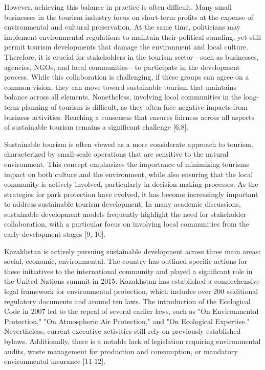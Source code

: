 However, achieving this balance in practice is often difficult. Many
small businesses in the tourism industry focus on short-term profits at
the expense of environmental and cultural preservation. At the same
time, politicians may implement environmental regulations to maintain
their political standing, yet still permit tourism developments that
damage the environment and local culture. Therefore, it is crucial for
stakeholders in the tourism sector---such as businesses, agencies, NGOs,
and local communities---to participate in the development process. While
this collaboration is challenging, if these groups can agree on a common
vision, they can move toward sustainable tourism that maintains balance
across all elements. Nonetheless, involving local communities in the
long-term planning of tourism is difficult, as they often face negative
impacts from business activities. Reaching a consensus that ensures
fairness across all aspects of sustainable tourism remains a significant
challenge {[}6,8{]}.

Sustainable tourism is often viewed as a more considerate approach to
tourism, characterized by small-scale operations that are sensitive to
the natural environment. This concept emphasizes the importance of
minimizing tourism\textquotesingle s impact on both culture and the
environment, while also ensuring that the local community is actively
involved, particularly in decision-making processes. As the strategies
for park protection have evolved, it has become increasingly important
to address sustainable tourism development. In many academic
discussions, sustainable development models frequently highlight the
need for stakeholder collaboration, with a particular focus on involving
local communities from the early development stages {[}9, 10{]}.

Kazakhstan is actively pursuing sustainable development across three
main areas: social, economic, environmental. The country has outlined
specific actions for these initiatives to the international community
and played a significant role in the United Nations summit in 2015.
Kazakhstan has established a comprehensive legal framework for
environmental protection, which includes over 200 additional regulatory
documents and around ten laws. The introduction of the Ecological Code
in 2007 led to the repeal of several earlier laws, such as "On
Environmental Protection," "On Atmospheric Air Protection," and "On
Ecological Expertise." Nevertheless, current executive activities still
rely on previously established bylaws. Additionally, there is a notable
lack of legislation requiring environmental audits, waste management for
production and consumption, or mandatory environmental insurance
{[}11-12{]}.


